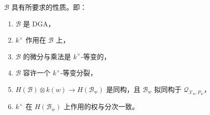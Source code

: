 \begin{lemma*}\label{lem:b-dga}
$\mathcal{B}$ 具有所要求的性质。即：
\begin{enumerate}
  \item\label{lem:B-1} $\mathcal{B}$ 是 DGA，
  \item\label{lem:B-2} $k^{\times}$ 作用在 $\mathcal{B}$ 上，
  \item\label{lem:B-3} $\mathcal{B}$ 的微分与乘法是 $k^{\times}$-等变的，
  \item\label{lem:B-4} $\mathcal{B}$ 容许一个 $k^{\times}$-等变分裂，
  \item\label{lem:B-5} $H(\mathcal{B})\otimes k(w)\to H(\mathcal{B}_w)$ 是同构，且 $\mathcal{B}_w$ 拟同构于 $\mathcal{Q}_{\mathcal{X}_w,P_w}$，
  \item\label{lem:B-6} $k^{\times}$ 在 $H(\mathcal{B}_w)$ 上作用的权与分次一致。
\end{enumerate}
\end{lemma*}

